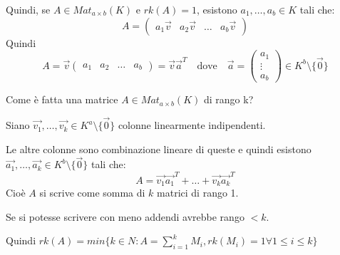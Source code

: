 \documentclass[../main.tex]{subfiles}
\begin{document}
Quindi, se $A \in Mat_{a \times b}(K)$ e $rk(A) = 1$, esistono $a_1, \ldots, a_b \in K$ tali che:
\begin{equation*}
    A = \begin{pmatrix}
        a_1 \overrightarrow{v} & a_2 \overrightarrow{v} & \ldots & a_b \overrightarrow{v}
    \end{pmatrix}
\end{equation*}
Quindi
\begin{equation*}
    A = \overrightarrow{v} \begin{pmatrix}
        a_1 & a_2 & \ldots & a_b
    \end{pmatrix} = \overrightarrow{v}\overrightarrow{a}^T
    \quad \text{dove} \quad \overrightarrow{a} = \begin{pmatrix}
        a_1    \\
        \vdots \\
        a_b
    \end{pmatrix} \in K^b \setminus \{\overrightarrow{0}\}
\end{equation*}

Come è fatta una matrice $A \in Mat_{a \times b}(K)$ di rango k?

Siano $\overrightarrow{v_1}, \ldots, \overrightarrow{v_k} \in K^a \setminus \{\overrightarrow{0}\}$ colonne linearmente indipendenti.

Le altre colonne sono combinazione lineare di queste e quindi esistono $\overrightarrow{a_1}, \ldots, \overrightarrow{a_k} \in K^b \setminus \{\overrightarrow{0}\}$ tali che:
\begin{equation*}
    A = \overrightarrow{v_1}\overrightarrow{a_1}^T + \ldots + \overrightarrow{v_k}\overrightarrow{a_k}^T
\end{equation*}
Cioè $A$ si scrive come somma di $k$ matrici di rango 1.

Se si potesse scrivere con meno addendi avrebbe rango $< k$.

Quindi $rk(A) = min \{ k \in N : A = \sum_{i=1}^{k} M_i, rk(M_i) = 1 \forall 1 \leq i \leq k\}$

\hrulefill
\end{document}
